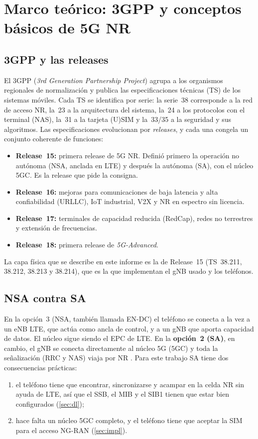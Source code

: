 \section{Marco teórico: 3GPP y conceptos básicos de 5G NR}\label{sec:marco}

\subsection{3GPP y las releases}
El 3GPP (\emph{3rd Generation Partnership Project}) agrupa a los organismos regionales de normalización y publica las especificaciones técnicas (TS) de los sistemas móviles. Cada TS se identifica por serie: la serie~38 corresponde a la red de acceso NR, la~23 a la arquitectura del sistema, la~24 a los protocolos con el terminal (NAS), la~31 a la tarjeta (U)SIM y la~33/35 a la seguridad y sus algoritmos. Las especificaciones evolucionan por \emph{releases}, y cada una congela un conjunto coherente de funciones:
\begin{itemize}
  \item \textbf{Release~15:} primera release de 5G NR. Definió primero la operación no autónoma (NSA, anclada en LTE) y después la autónoma (SA), con el núcleo 5GC. Es la release que pide la consigna.
  \item \textbf{Release~16:} mejoras para comunicaciones de baja latencia y alta confiabilidad (URLLC), IoT industrial, V2X y NR en espectro sin licencia.
  \item \textbf{Release~17:} terminales de capacidad reducida (RedCap), redes no terrestres y extensión de frecuencias.
  \item \textbf{Release~18:} primera release de \emph{5G-Advanced}.
\end{itemize}
La capa física que se describe en este informe es la de Release~15 (TS~38.211, 38.212, 38.213 y 38.214), que es la que implementan el gNB usado y los teléfonos.

\subsection{NSA contra SA}
En la opción~3 (NSA, también llamada EN-DC) el teléfono se conecta a la vez a un eNB LTE, que actúa como ancla de control, y a un gNB que aporta capacidad de datos. El núcleo sigue siendo el EPC de LTE. En la \textbf{opción~2 (SA)}, en cambio, el gNB se conecta directamente al núcleo 5G (5GC) y toda la señalización (RRC y NAS) viaja por NR \cite{ts38300}. Para este trabajo SA tiene dos consecuencias prácticas:
\begin{enumerate}
  \item el teléfono tiene que encontrar, sincronizarse y acampar en la celda NR sin ayuda de LTE, así que el SSB, el MIB y el SIB1 tienen que estar bien configurados (\cref{sec:dl});
  \item hace falta un núcleo 5GC completo, y el teléfono tiene que aceptar la SIM para el acceso NG-RAN (\cref{sec:impl}).
\end{enumerate}

